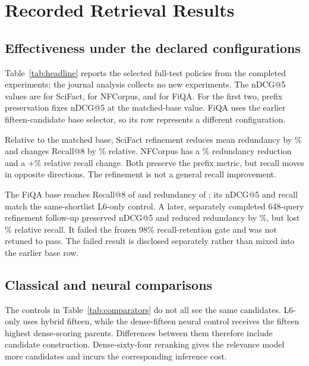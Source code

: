 \section{Recorded Retrieval Results}\label{sec:results}
\subsection{Effectiveness under the declared configurations}
Table~\ref{tab:headline} reports the selected full-test policies from the completed experiments; the journal analysis collects no new experiments. The nDCG@5 values are \scifactNdcg{} for SciFact, \nfcorpusNdcg{} for NFCorpus, and \fiqaNdcg{} for FiQA. For the first two, prefix preservation fixes nDCG@5 at the matched-base value. FiQA uses the earlier fifteen-candidate base selector, so its row represents a different configuration.

\begin{table}[t]
\centering\small\setlength{\tabcolsep}{3pt}
\caption{Reported full-test policies. SciFact/NFCorpus include refinement; FiQA uses the earlier base. All quantities within a row come from the same recorded policy.}
\label{tab:headline}
\end{table}

Relative to the matched base, SciFact refinement reduces mean redundancy by \scifactRedReduction\% and changes Recall@8 by \scifactRecallChange\% relative. NFCorpus has a \nfcorpusRedReduction\% redundancy reduction and a +\nfcorpusRecallChange\% relative recall change. Both preserve the prefix metric, but recall moves in opposite directions. The refinement is not a general recall improvement.

The FiQA base reaches Recall@8 of \fiqaRecall{} and redundancy of \fiqaRedundancy{}; its nDCG@5 and recall match the same-shortlist L6-only control. A later, separately completed 648-query refinement follow-up preserved nDCG@5 and reduced redundancy by \fiqaFollowupRedReduction\%, but lost \fiqaFollowupRecallLoss\% relative recall. It failed the frozen 98\% recall-retention gate and was not retuned to pass. The failed result is disclosed separately rather than mixed into the earlier base row.

\subsection{Classical and neural comparisons}
The controls in Table~\ref{tab:comparators} do not all see the same candidates. L6-only uses hybrid fifteen, while the dense-fifteen neural control receives the fifteen highest dense-scoring parents. Differences between them therefore include candidate construction. Dense-sixty-four reranking gives the relevance model more candidates and incurs the corresponding inference cost.

